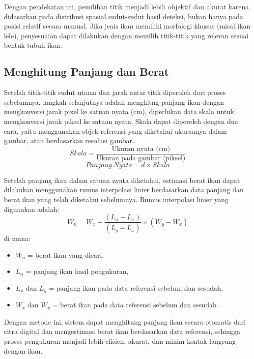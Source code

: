     Dengan pendekatan ini, pemilihan titik menjadi lebih objektif dan akurat karena didasarkan pada distribusi spasial sudut-sudut hasil deteksi, bukan hanya pada posisi relatif secara manual. Jika jenis ikan memiliki morfologi khusus (misal ikan lele), penyesuaian dapat dilakukan dengan memilih titik-titik yang relevan sesuai bentuk tubuh ikan.
\subsection{Menghitung Panjang dan Berat}
    Setelah titik-titik sudut utama dan jarak antar titik diperoleh dari proses sebelumnya, langkah selanjutnya adalah menghitng panjang ikan dengan mengkonversi jarak pixel ke satuan nyata (cm), diperlukan data skala untuk mengkonversi jarak piksel ke satuan nyata. Skala dapat diperoleh dengan dua cara, yaitu menggunakan objek referensi yang diketahui ukurannya dalam gambar, atau berdasarkan resolusi gambar.
\begin{equation*}
    Skala = \frac{\text{Ukuran nyata (cm)}}{\text{Ukuran pada gambar (piksel)}}
\end{equation*}
\begin{equation}
    Panjang\ Nyata = d \times Skala
\end{equation}

    Setelah panjang ikan dalam satuan nyata diketahui, estimasi berat ikan dapat dilakukan menggunakan rumus interpolasi linier berdasarkan data panjang dan berat ikan yang telah diketahui sebelumnya. Rumus interpolasi linier yang digunakan adalah:
\begin{equation}
    W_n = W_x + \frac{(L_n - L_x)}{(L_y - L_x)} \times (W_y - W_x)
\end{equation}
    di mana:
\begin{itemize}
    \item \(W_n\) = berat ikan yang dicari,
    \item \(L_n\) = panjang ikan hasil pengukuran,
    \item \(L_x\) dan \(L_y\) = panjang ikan pada data referensi sebelum dan sesudah,
    \item \(W_x\) dan \(W_y\) = berat ikan pada data referensi sebelum dan sesudah.
\end{itemize}

    Dengan metode ini, sistem dapat menghitung panjang ikan secara otomatis dari citra digital dan mengestimasi berat ikan berdasarkan data referensi, sehingga proses pengukuran menjadi lebih efisien, akurat, dan minim kontak langsung dengan ikan.

